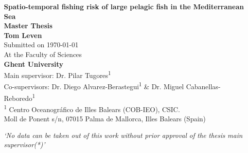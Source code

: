 \begin{titlepage}
	\begin{center}
		{\LARGE \textbf{Spatio-temporal fishing risk of large pelagic fish in the Mediterranean Sea}}\\[1.5cm]

		\textbf{Master Thesis}\\
		\textbf{Tom Leven}\\
		Submitted on \today\\[1.5cm]

		At the Faculty of Sciences\\ \textbf{Ghent University}\\[1.5cm]

		Main supervisor: Dr. Pilar Tugores\textsuperscript{1}\\ Co-supervisors: Dr. Diego
		Alvarez-Berastegui\textsuperscript{1} \& Dr. Miguel Cabanellas-Reboredo\textsuperscript{1}\\[1cm]

		\textsuperscript{1} \small{Centro Oceanográfico de Illes Balears (COB-IEO), CSIC\@.\\Moll de Ponent s/n, 07015 Palma de Mallorca, Illes Balears (Spain)}

	\end{center}

\end{titlepage}
\restoregeometry
\newpage
\thispagestyle{empty}
\vspace*{\fill}
\begin{center}
	\textit{‘No data can be taken out of this work without prior approval of the thesis main supervisor(*)’}
\end{center}
\vspace*{\fill}
